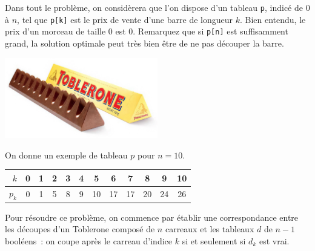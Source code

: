 \documentclass{magnolia}
\begin{document}
Dans tout le problème, on considèrera que l'on dispose d'un tableau
\verb!p!, indicé de $0$ à $n$, tel que \verb!p[k]! est le prix de
vente d'une barre de longueur $k$. Bien entendu, le prix d'un morceau de taille 0
est 0. Remarquez que si \verb!p[n]! est suffisamment grand, la solution optimale peut
très bien être de ne pas découper la barre.

\begin{center}
\includegraphics[width=0.5\textwidth]{../../Commun/Images/python-exos-toblerone}
\end{center}

\noindent On donne un exemple de tableau $p$ pour $n = 10$.
\begin{center}
  \begin{tabular}{r *{11}{c}}
    \toprule
    $k$   & 0 & 1 & 2 & 3 & 4 & 5 & 6 & 7 & 8 & 9 & 10\\
    \midrule
    ${p_k}$ & 0 & 1 & 5 & 8 & 9 & 10& 17& 17 & 20& 24& 26 \\
    \bottomrule
  \end{tabular}
\end{center}

Pour résoudre ce problème, on commence par établir une correspondance entre
les découpes d'un Toblerone composé de $n$ carreaux et les tableaux $d$
de $n-1$ booléens~: on coupe après le carreau d'indice $k$ si et seulement si
$d_k$ est vrai.
\end{document}
